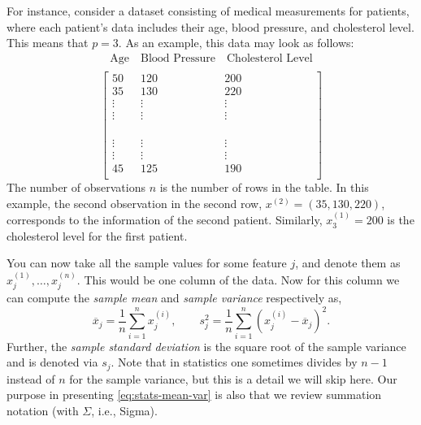 \documentclass[12pt]{article}
\begin{document}
For instance, consider a dataset consisting of medical measurements for patients, where each patient's data includes their age, blood pressure, and cholesterol level. This means that $p=3$. As an example, this data may look as follows:
%
\[
\begin{array}{c}
\text{Age} \quad \text{Blood Pressure} \quad \text{Cholesterol Level} \\
\end{array}
\]
\begin{equation}
\label{eq:data-table}
\left[ \begin{array}{ccc}
50 & 120 & 200 \\
35 & 130 & 220 \\
\vdots & \vdots & \vdots \\
\vdots & \vdots & \vdots \\
\phantom{\text{Age}} & \phantom{\text{Blood Pressure}} & \phantom{\text{Cholesterol Level}}\\
\vdots & \vdots & \vdots \\
\vdots & \vdots & \vdots \\
45 & 125 & 190 \\
\end{array} \right]
\end{equation}
%
The number of observations $n$ is the number of rows in the table.
In this example, the second observation in the second row, $x^{(2)}= (35,130,220)$, corresponds to the information of the second patient. Similarly, $x_3^{(1)} = 200$ is the cholesterol level for the first patient. 

You can now take all the sample values for some feature $j$, and denote them as $x_j^{(1)}, \ldots, x_j^{(n)}$. This would be one column of the data.  
Now for this column we can compute the \textit{sample mean} and \textit{sample variance} respectively as,
%
\begin{equation}
\label{eq:stats-mean-var}
\overline{x}_j = \frac{1}{n} \sum_{i=1}^n x_j^{(i)},
\qquad
s^2_j = \frac{1}{n} \sum_{i=1}^n (x_j^{(i)} - \overline{x}_j)^2.
\end{equation}
%
Further, the \textit{sample standard deviation} is the square root of the sample variance and is denoted via $s_j$. Note that in statistics one sometimes divides by $n-1$ instead of $n$ for the sample variance, but this is a detail we will skip here. Our purpose in presenting \eqref{eq:stats-mean-var} is also that we review summation notation (with $\Sigma$, i.e., Sigma).
\end{document}
